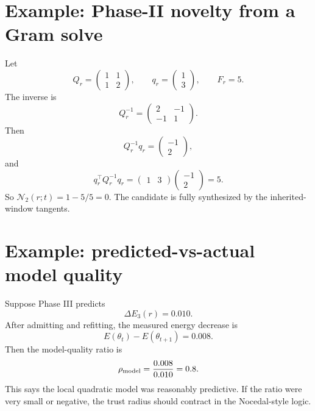 \documentclass[10pt,twocolumn]{article}
\newcommand{\twovec}[2]{\begin{pmatrix}#1\\#2\end{pmatrix}}
\begin{document}
\section{Example: Phase-II novelty from a Gram solve}

Let
\begin{equation}
Q_r=
\begin{pmatrix}
1&1\\
1&2
\end{pmatrix},
\qquad
q_r=\twovec{1}{3},
\qquad
F_r=5.
\label{eq:ex7_data}
\end{equation}
The inverse is
\begin{equation}
Q_r^{-1}=
\begin{pmatrix}
2&-1\\
-1&1
\end{pmatrix}.
\label{eq:ex7_inv}
\end{equation}
Then
\begin{equation}
Q_r^{-1}q_r
=
\twovec{-1}{2},
\label{eq:ex7_beta}
\end{equation}
and
\begin{equation}
q_r^\top Q_r^{-1}q_r
=
\begin{pmatrix}1&3\end{pmatrix}
\twovec{-1}{2}
=5.
\label{eq:ex7_explained}
\end{equation}
So \(\mathcal N_2(r;t)=1-5/5=0\). The candidate is fully synthesized by the inherited-window tangents.

\section{Example: predicted-vs-actual model quality}

Suppose Phase III predicts
\begin{equation}
\Delta E_3(r)=0.010.
\label{eq:ex8_pred}
\end{equation}
After admitting and refitting, the measured energy decrease is
\begin{equation}
E(\theta_t)-E(\theta_{t+1})=0.008.
\label{eq:ex8_actual}
\end{equation}
Then the model-quality ratio is
\begin{equation}
\rho_{\rm model}=\frac{0.008}{0.010}=0.8.
\label{eq:ex8_ratio}
\end{equation}
This says the local quadratic model was reasonably predictive. If the ratio were very small or negative, the trust radius should contract in the Nocedal-style logic.
\end{document}
